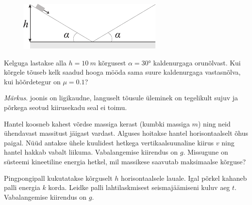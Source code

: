 \documentclass[10pt]{article}
\begin{document}
{\bigskip


\begin{figure}
	\begin{center}
		\vspace{-20pt}
		\hspace{-10pt}
		\includegraphics[width=\linewidth]{2008-lahg-02-yl}
	\end{center}
\end{figure}
Kelguga lastakse alla $h = \SI{10}{m}$ kõrgusest $\alpha = \ang{30}$ kaldenurgaga orunõlvast. Kui kõrgele tõuseb kelk saadud hooga mööda sama suure kaldenurgaga vastasnõlva, kui hõõrdetegur on $\mu = \num{0,1}$? 

\emph{Märkus}. joonis on ligikaudne, languselt tõusule üleminek on tegelikult sujuv ja põrkega seotud kiirusekadu seal ei toimu.
\probend
\bigskip


Hantel koosneb kahest võrdse massiga kerast (kumbki massiga $m$) ning neid ühendavast massitust jäigast vardast. Alguses hoitakse hantel horisontaalselt õhus paigal. Nüüd antakse ühele kuulidest hetkega vertikaalsuunaline kiirus $v$ ning hantel hakkab vabalt liikuma. Vabalangemise kiirendus on $g$. Missugune on süsteemi kineetiline energia hetkel, mil massikese saavutab maksimaalse kõrguse?
\probend
\bigskip


Pingpongipall kukutatakse kõrguselt $h$ horisontaalsele lauale. Igal põrkel kahaneb palli energia $k$ korda. Leidke palli lahtilaskmisest seismajäämiseni kuluv aeg $t$. Vabalangemise kiirendus on $g$.
\probend
\bigskip

}
\end{document}
